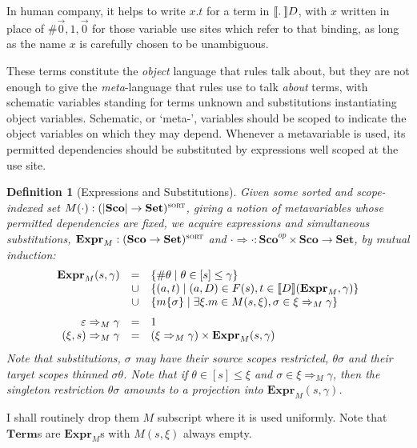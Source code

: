 \documentclass[format=acmsmall, screen, review, anonymous, timestamp]{acmart}
\newtheorem{defn}[thm]{Definition}
\newcommand{\emp}{\varepsilon}
\newcommand{\op}{^{op}}
\begin{document}
In human company, it helps to write $x.t$ for a term in $\sem\db D$,
with $x$ written in place of $\#\vec0,1,\vec0$ for those variable use
sites which refer to that binding, as long as the name $x$ is
carefully chosen to be unambiguous.

These terms constitute the \emph{object} language that rules talk
about, but they are not enough to give the \emph{meta}-language that
rules use to talk \emph{about} terms, with schematic variables
standing for terms unknown and substitutions instantiating object
variables. Schematic, or `meta-', variables should be scoped to
indicate the object variables on which they may depend. Whenever a
metavariable is used, its permitted dependencies should be substituted
by expressions well scoped at the use site.

\newcommand{\Sb}{\Rightarrow}
\begin{defn}[Expressions and Substitutions]
 Given some sorted and scope-indexed set $M(\cdot) :
(|\textbf{Sco}|\to\textbf{Set})^{\textsc{sort}}$, giving a notion of
metavariables whose permitted dependencies are fixed, we
acquire expressions and simultaneous substitutions, $\textbf{Expr}_M:
(\textbf{Sco}\to\textbf{Set})^{\textsc{sort}}$ and
$\cdot\Sb\cdot :
\textbf{Sco}\op\times\textbf{Sco}\to\textbf{Set}$,
by mutual induction:
  \[\begin{array}{rcl}
      \textbf{Expr}_M(s, \gamma)
        &=& \{\#\theta\st\theta\in[s]\le \gamma\}\\
        &\cup& \{(a,t) \st (a,D)\in F(s),
               t\in\sem{D}(\textbf{Expr}_M,\gamma)\}\\
        &\cup& \{m\{\sigma\} \st \exists \xi.
               m\in M(s,\xi),  \sigma\in
               \xi\Sb_M\gamma\}\medskip\\
      \emp\Sb_M\gamma & = & 1 \\
      (\xi,s)\Sb_M\gamma & = & (\xi\Sb_M\gamma)\times \textbf{Expr}_M(s,
                             \gamma) 
  \end{array}\]
Note that substitutions, $\sigma$ may have their source scopes
restricted, $\theta\sigma$ and
their target scopes thinned $\sigma\theta$. Note that if
$\theta\in[s]\le\xi$ and $\sigma\in\xi\Sb_M\gamma$, then the
singleton restriction $\theta\sigma$ amounts to a projection into
$\textbf{Expr}_M(s,\gamma)$.
\end{defn}

I shall routinely drop them $M$ subscript where it is used uniformly.
Note that $\textbf{Term}$s are $\textbf{Expr}_M$s with $M(s,\xi)$ always
empty.
\end{document}
